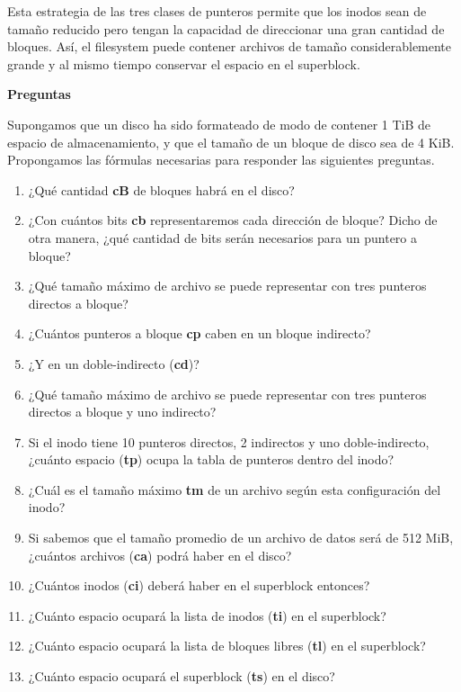 \documentclass[spanish,a4paper,]{article}
\providecommand{\tightlist}{%
  \setlength{\itemsep}{0pt}\setlength{\parskip}{0pt}}
\begin{document}
Esta estrategia de las tres clases de punteros permite que los inodos
sean de tamaño reducido pero tengan la capacidad de direccionar una gran
cantidad de bloques. Así, el filesystem puede contener archivos de
tamaño considerablemente grande y al mismo tiempo conservar el espacio
en el superblock.

\textbf{Preguntas}

Supongamos que un disco ha sido formateado de modo de contener 1 TiB de
espacio de almacenamiento, y que el tamaño de un bloque de disco sea de
4 KiB. Propongamos las fórmulas necesarias para responder las siguientes
preguntas.

\begin{enumerate}
\def\labelenumi{\arabic{enumi}.}
\tightlist
\item
  ¿Qué cantidad \textbf{cB} de bloques habrá en el disco?
\item
  ¿Con cuántos bits \textbf{cb} representaremos cada dirección de
  bloque? Dicho de otra manera, ¿qué cantidad de bits serán necesarios
  para un puntero a bloque?
\item
  ¿Qué tamaño máximo de archivo se puede representar con tres punteros
  directos a bloque?
\item
  ¿Cuántos punteros a bloque \textbf{cp} caben en un bloque indirecto?
\item
  ¿Y en un doble-indirecto (\textbf{cd})?
\item
  ¿Qué tamaño máximo de archivo se puede representar con tres punteros
  directos a bloque y uno indirecto?
\item
  Si el inodo tiene 10 punteros directos, 2 indirectos y uno
  doble-indirecto, ¿cuánto espacio (\textbf{tp}) ocupa la tabla de
  punteros dentro del inodo?
\item
  ¿Cuál es el tamaño máximo \textbf{tm} de un archivo según esta
  configuración del inodo?
\item
  Si sabemos que el tamaño promedio de un archivo de datos será de 512
  MiB, ¿cuántos archivos (\textbf{ca}) podrá haber en el disco?
\item
  ¿Cuántos inodos (\textbf{ci}) deberá haber en el superblock entonces?
\item
  ¿Cuánto espacio ocupará la lista de inodos (\textbf{ti}) en el
  superblock?
\item
  ¿Cuánto espacio ocupará la lista de bloques libres (\textbf{tl}) en el
  superblock?
\item
  ¿Cuánto espacio ocupará el superblock (\textbf{ts}) en el disco?
\end{enumerate}
\end{document}
